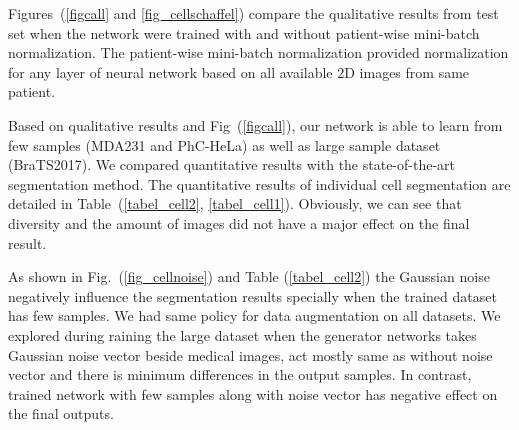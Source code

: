 \documentclass[10pt,twocolumn,letterpaper]{article}
\begin{document}
Figures~(\ref{figcall} and \ref{fig_cellschaffel}) compare the qualitative results from test set when the network were trained with and without patient-wise mini-batch normalization. The patient-wise mini-batch normalization provided normalization for any layer of neural network based on all available 2D images from same patient.%

Based on qualitative results and Fig~(\ref{figcall}), our network is able to learn from few samples (MDA231 and PhC-HeLa) as well as large sample dataset (BraTS2017). We compared quantitative results with the state-of-the-art segmentation method. The quantitative results of individual cell segmentation are detailed in Table~(\ref{tabel_cell2}, \ref{tabel_cell1}). Obviously, we can see that diversity and the amount of images did not have a major effect on the final result.

As shown in Fig.~(\ref{fig_cellnoise}) and Table (\ref{tabel_cell2}) the Gaussian noise negatively influence the segmentation results specially when the trained dataset has few samples.
We had same policy for data augmentation on all datasets.
We explored during raining the large dataset when the generator networks takes Gaussian noise vector beside medical images, act mostly same as without noise vector and there is minimum differences in the output samples. In contrast, trained network with few samples along with noise vector has negative effect on the final outputs.
\end{document}
